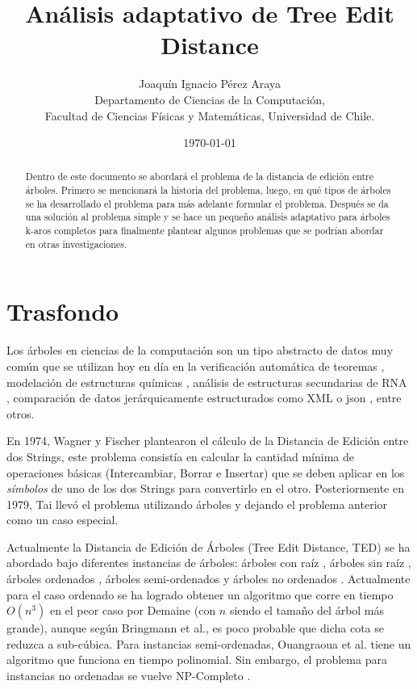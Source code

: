 \documentclass{article}
\begin{document}
\title{Análisis adaptativo de Tree Edit Distance}
\author{Joaquín Ignacio Pérez Araya\footnotemark \\ Departamento de Ciencias de la Computación, \\ Facultad de Ciencias Físicas y Matemáticas, Universidad de Chile.}
\date{\today}


\maketitle

\begin{abstract}
Dentro de este documento se abordará el problema de la distancia de edición entre árboles. Primero se mencionará la historia del problema, luego, en qué tipos de árboles se ha desarrollado el problema para más adelante formular el problema. Después se da una solución al problema simple y se hace un pequeño análisis adaptativo para árboles k-aros completos para finalmente plantear algunos problemas que se podrían abordar en otras investigaciones.

\end{abstract}

\section{Trasfondo} 
Los árboles en ciencias de la computación son un tipo abstracto de datos muy común que se utilizan hoy en día en la verificación automática de teoremas \cite{AP1}, modelación de estructuras químicas \cite{AP2}, análisis de estructuras secundarias de RNA \cite{AP3,AP4}, comparación de datos jerárquicamente estructurados como XML o json \cite{AP5}, entre otros.

En 1974, Wagner y Fischer \cite{String} plantearon el cálculo de la Distancia de Edición entre dos Strings, este problema consistía en calcular la cantidad mínima de operaciones básicas (Intercambiar, Borrar e Insertar) que se deben aplicar en los \textit{símbolos} de uno de los dos Strings para convertirlo en el otro. Posteriormente en 1979, Tai \cite{TED1} llevó el problema utilizando árboles y dejando el problema anterior como un caso especial.

Actualmente la Distancia de Edición de Árboles (Tree Edit Distance, TED) se ha abordado bajo diferentes instancias de árboles: árboles con raíz \cite{TED1,TED2,TED3,TED4,TED5,TED7,TED8}, árboles sin raíz \cite{TED6},  árboles ordenados \cite{TED1,TED2,TED8}, árboles semi-ordenados \cite{TED3} y árboles no ordenados \cite{TED7}. Actualmente para el caso ordenado se ha logrado obtener un algoritmo que corre en tiempo $O(n^3)$  en el peor caso por Demaine \cite{TED4} (con $n$ siendo el tamaño del árbol más grande), aunque según Bringmann et al., es poco probable que dicha cota se reduzca a sub-cúbica\cite{TED10}. Para instancias semi-ordenadas, Ouangraoua et al. \cite{TED3} tiene un algoritmo que funciona en tiempo polinomial. Sin embargo, el problema para instancias no ordenadas se vuelve NP-Completo \cite{TED9}.
\end{document}
